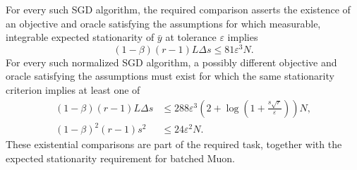 \documentclass[10pt]{article}
\theoremstyle{definition}
\begin{document}
For every such SGD algorithm, the required comparison asserts the existence of an objective and oracle satisfying the assumptions for which measurable, integrable expected stationarity of $\bar{y}$ at tolerance $\varepsilon$ implies
\[
(1-\beta)(r-1)L\Delta s\leq81\varepsilon^3N.
\]
For every such normalized SGD algorithm, a possibly different objective and oracle satisfying the assumptions must exist for which the same stationarity criterion implies at least one of
\[
\begin{aligned}
(1-\beta)(r-1)L\Delta s
&\leq288\varepsilon^3
\left(2+\log\left(1+\frac{s\sqrt r}{\varepsilon}\right)\right)N,\\
(1-\beta)^2(r-1)s^2
&\leq24\varepsilon^2N.
\end{aligned}
\]
These existential comparisons are part of the required task, together with the expected stationarity requirement for batched Muon.
\end{document}
